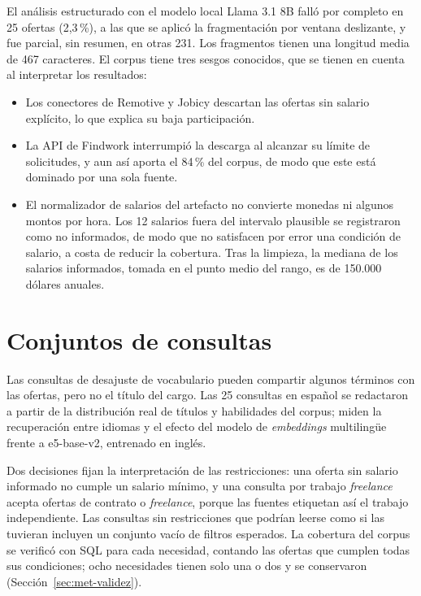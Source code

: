 El análisis estructurado con el modelo local Llama 3.1 8B falló por completo en 25 ofertas (2,3\,\%), a las que se aplicó la fragmentación por ventana deslizante, y fue parcial, sin resumen, en otras 231. Los fragmentos tienen una longitud media de 467 caracteres. El corpus tiene tres sesgos conocidos, que se tienen en cuenta al interpretar los resultados:
\begin{itemize}
    \item Los conectores de Remotive y Jobicy descartan las ofertas sin salario explícito, lo que explica su baja participación.
    \item La API de Findwork interrumpió la descarga al alcanzar su límite de solicitudes, y aun así aporta el 84\,\% del corpus, de modo que este está dominado por una sola fuente.
    \item El normalizador de salarios del artefacto no convierte monedas ni algunos montos por hora. Los 12 salarios fuera del intervalo plausible se registraron como no informados, de modo que no satisfacen por error una condición de salario, a costa de reducir la cobertura. Tras la limpieza, la mediana de los salarios informados, tomada en el punto medio del rango, es de 150.000 dólares anuales.
\end{itemize}

\section{Conjuntos de consultas}
\label{anx:consultas}

Las consultas de desajuste de vocabulario pueden compartir algunos términos con las ofertas, pero no el título del cargo. Las 25 consultas en español se redactaron a partir de la distribución real de títulos y habilidades del corpus; miden la recuperación entre idiomas y el efecto del modelo de \textit{embeddings} multilingüe frente a e5-base-v2, entrenado en inglés.

Dos decisiones fijan la interpretación de las restricciones: una oferta sin salario informado no cumple un salario mínimo, y una consulta por trabajo \textit{freelance} acepta ofertas de contrato o \textit{freelance}, porque las fuentes etiquetan así el trabajo independiente. Las consultas sin restricciones que podrían leerse como si las tuvieran incluyen un conjunto vacío de filtros esperados. La cobertura del corpus se verificó con SQL para cada necesidad, contando las ofertas que cumplen todas sus condiciones; ocho necesidades tienen solo una o dos y se conservaron (Sección~\ref{sec:met-validez}).


